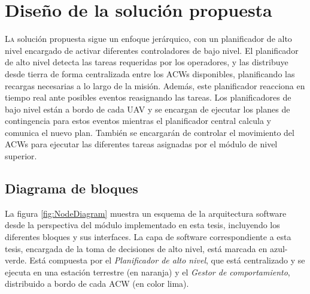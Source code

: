 \documentclass[fontsize=11pt, English=false, Español=true, Myfinal=true, twoside, numbers=noenddot]{scrbook}
\begin{document}
%
\chapter{Diseño de la solución propuesta}
\label{ch:DesignOfTheProposedSolution}
\lettrine[lraise=-0.1, lines=2, loversize=0.2]{L}{a} solución propuesta sigue un enfoque jerárquico, con un planificador de alto nivel encargado de activar diferentes controladores de bajo nivel. El planificador de alto nivel detecta las tareas requeridas por los operadores, y las distribuye desde tierra de forma centralizada entre los \glspl{ACW} disponibles, planificando las recargas necesarias a lo largo de la misión. Además, este planificador reacciona en tiempo real ante posibles eventos reasignando las tareas. Los planificadores de bajo nivel están a bordo de cada \gls{UAV} y se encargan de ejecutar los planes de contingencia para estos eventos mientras el planificador central calcula y comunica el nuevo plan. También se encargarán de controlar el movimiento del \glspl{ACW} para ejecutar las diferentes tareas asignadas por el módulo de nivel superior.

\section{Diagrama de bloques}
\label{sec:NodeDiagram}
La figura \ref{fig:NodeDiagram} muestra un esquema de la arquitectura software desde la perspectiva del módulo implementado en esta tesis, incluyendo los diferentes bloques y sus interfaces. La capa de software correspondiente a esta tesis, encargada de la toma de decisiones de alto nivel, está marcada en azul-verde. Está compuesta por el \emph{Planificador de alto nivel}, que está centralizado y se ejecuta en una estación terrestre (en naranja) y el \emph{Gestor de comportamiento}, distribuido a bordo de cada \gls{ACW} (en color lima).
\end{document}
